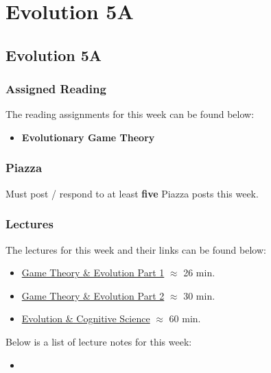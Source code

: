 \clearpage

\renewcommand{\ChapTitle}{Evolution 5A}
\renewcommand{\SectionTitle}{Evolution 5A}

\chapter{\ChapTitle}
\section{\SectionTitle}

\subsection{Assigned Reading}

The reading assignments for this week can be found below:

\begin{itemize}
    \item \textbf{Evolutionary Game Theory}
\end{itemize}

\subsection{Piazza}

Must post / respond to at least \textbf{five} Piazza posts this week.

\subsection{Lectures}

The lectures for this week and their links can be found below:

\begin{itemize}
    \item \href{https://www.youtube.com/watch?v=fBDjfR1KCZA}{Game Theory \& Evolution Part 1} $\approx$ 26 min.
    \item \href{https://www.youtube.com/watch?v=b4yV21CZJFA}{Game Theory \& Evolution Part 2} $\approx$ 30 min.
    \item \href{https://www.youtube.com/watch?v=vbCVXcXF88I}{Evolution \& Cognitive Science} $\approx$ 60 min.
\end{itemize}

\noindent Below is a list of lecture notes for this week:

\begin{itemize}
    \item {}
\end{itemize}

